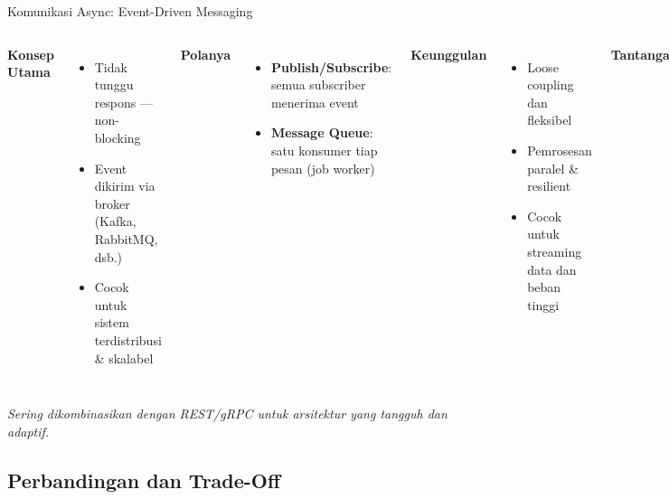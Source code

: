 \documentclass[aspectratio=169, table]{beamer}
\begin{document}
\begin{frame}[fragile]{Komunikasi Async: Event-Driven Messaging}
	\vspace{20pt}
	\begin{columns}[T]
		\textbf{Konsep Utama}
		\begin{itemize}
			\item Tidak tunggu respons — non-blocking
			\item Event dikirim via broker (Kafka, RabbitMQ, dsb.)
			\item Cocok untuk sistem terdistribusi \& skalabel
		\end{itemize}
		
		\textbf{Polanya}
		\begin{itemize}
			\item \textbf{Publish/Subscribe}: semua subscriber menerima event
			\item \textbf{Message Queue}: satu konsumer tiap pesan (job worker)
		\end{itemize}
		
		\textbf{Keunggulan}
		\begin{itemize}
			\item Loose coupling dan fleksibel
			\item Pemrosesan paralel \& resilient
			\item Cocok untuk streaming data dan beban tinggi
		\end{itemize}
		
		\textbf{Tantangan}
		\begin{itemize}
			\item Sulit observability dan tracing
			\item Perlu retry, idempoten, dan penanganan duplikasi
			\item Konsistensi data terdistribusi jadi isu
		\end{itemize}
	\end{columns}
	\vspace{5pt}
	\scriptsize
	\textit{Sering dikombinasikan dengan REST/gRPC untuk arsitektur yang tangguh dan adaptif.}
\end{frame}



\subsection{Perbandingan dan Trade-Off}
\end{document}
